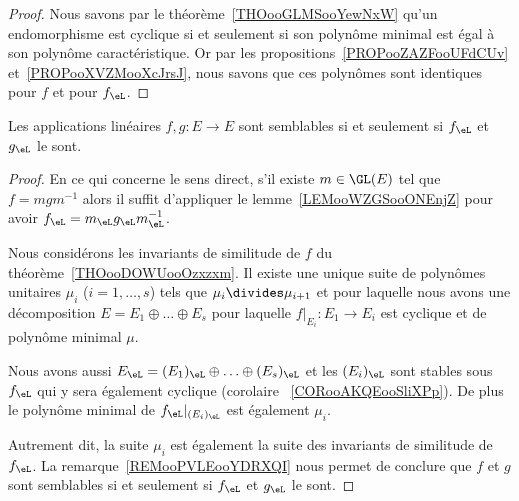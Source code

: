 \begin{proof}
    Nous savons par le théorème~\ref{THOooGLMSooYewNxW} qu'un endomorphisme est cyclique si et seulement si son polynôme minimal est égal à son polynôme caractéristique. Or par les propositions~\ref{PROPooZAZFooUFdCUv} et~\ref{PROPooXVZMooXcJrsJ}, nous savons que ces polynômes sont identiques pour \( f\) et pour \( f_{\eL}\).
\end{proof}

\begin{theorem}      \label{THOooHUFBooReKZWG}
    Les applications linéaires \( f,g\colon E\to E\) sont semblables si et seulement si \( f_{\eL}\) et \( g_{\eL}\) le sont.
\end{theorem}

\begin{proof}
    En ce qui concerne le sens direct, s'il existe \( m\in\GL(E)\) tel que \( f=mgm^{-1}\) alors il suffit d'appliquer le lemme~\ref{LEMooWZGSooONEnjZ} pour avoir \( f_{\eL}=m_{\eL}g_{\eL}m_{\eL}^{-1}\).

    Nous considérons les invariants de similitude de \( f\) du théorème~\ref{THOooDOWUooOzxzxm}. Il existe une unique suite de polynômes unitaires \( \mu_i\) ($i=1,\ldots, s$) tels que \( \mu_i\divides \mu_{i+1}\) et pour laquelle nous avons une décomposition \( E=E_1\oplus \ldots\oplus E_s\) pour laquelle \( f|_{E_i}\colon E_1\to E_i\) est cyclique et de polynôme minimal \( \mu\).

    Nous avons aussi \( E_{\eL}=(E_1)_{\eL}\oplus\ldots \oplus (E_s)_{\eL}\) et les \( (E_i)_{\eL}\) sont stables sous \( f_{\eL}\) qui y sera également cyclique (corolaire ~\ref{CORooAKQEooSliXPp}). De plus le polynôme minimal de \( f_{\eL}|_{(E_i)_{\eL}}\) est également \( \mu_i\).

    Autrement dit, la suite \( \mu_i\) est également la suite des invariants de similitude de \( f_{\eL}\). La remarque~\ref{REMooPVLEooYDRXQI} nous permet de conclure que \( f\) et \( g\) sont semblables si et seulement si \( f_{\eL}\) et \( g_{\eL}\) le sont.
\end{proof}
